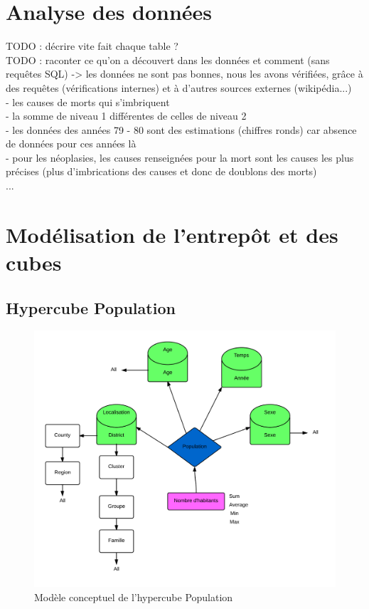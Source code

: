 \chapter{Analyse des données}

TODO : décrire vite fait chaque table ? \\
TODO : raconter ce qu'on a découvert dans les données et comment (sans requêtes SQL) -> les données ne sont pas bonnes, nous les avons vérifiées, grâce à des requêtes (vérifications internes) et à d'autres sources externes (wikipédia...) \\
 - les causes de morts qui s'imbriquent \\
 - la somme de niveau 1 différentes de celles de niveau 2 \\
 - les données des années 79 - 80 sont des estimations (chiffres ronds) car absence de données pour ces années là \\
 - pour les néoplasies, les causes renseignées pour la mort sont les causes les plus précises (plus d'imbrications des causes et donc de doublons des morts) \\
 ...


\pagebreak


\chapter{Modélisation de l'entrepôt et des cubes}

\section{Hypercube Population}
\begin{figure}[h!]
    \centering
    \includegraphics[width=\linewidth]{images/pop/cube.png}
    \caption{Modèle conceptuel de l'hypercube Population}
    \label{conception_cube_pop}
\end{figure}

